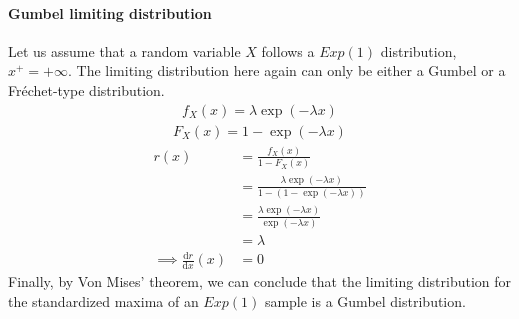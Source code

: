 \paragraph{Gumbel limiting distribution}
Let us assume that a random variable $X$ follows a $Exp(1)$ distribution, $x^+ = + \infty$. The limiting distribution here again can only be either a Gumbel or a Fréchet-type distribution.
\begin{equation}
\begin{alignat*}{2}
f_X(x) = \lambda \exp(- \lambda x)
\end{alignat*}
\end{equation}
\begin{equation}
\begin{alignat*}{2}
F_X(x) =  1 - \exp(- \lambda x)
\end{alignat*}
\end{equation}
\begin{equation}
\begin{alignat*}{2}
r(x) &= \frac{f_X(x)}{1 - F_X(x)} \\
&= \frac{\lambda \exp(- \lambda x)}{1 - (1 - \exp(- \lambda x))} \\
&= \frac{\lambda \exp(- \lambda x)}{\exp(- \lambda x)} \\
&= \lambda \\
\implies \frac{\mathrm{d}r}{\mathrm{d}x}(x) &= 0
\end{alignat*}
\end{equation}
Finally, by Von Mises' theorem, we can conclude that the limiting distribution for the standardized maxima of an $Exp(1)$ sample is a Gumbel distribution.
